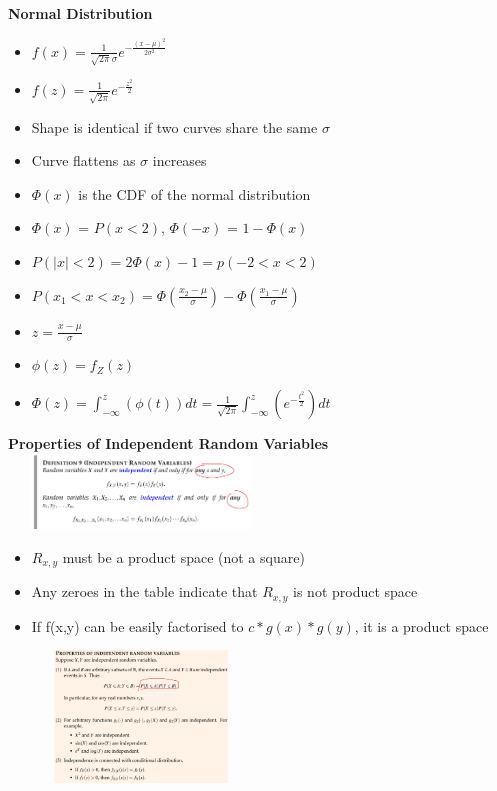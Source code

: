 \documentclass[10pt, landscape]{article}
\begin{document}
\begin{multicols}{4}
\textbf{Normal Distribution} \newline
\begin{itemize}
  \item $f(x)=\frac{1}{\sqrt{2\pi}\sigma}e^{-\frac{(x-\mu)^2}{2\sigma^2}}$
  \item $f(z) = \frac{1}{\sqrt{2\pi}}e^{-\frac{z^2}{2}}$
  \item Shape is identical if two curves share the same $\sigma$
  \item Curve flattens as $\sigma$ increases
  \item $\Phi(x)$ is the CDF of the normal distribution
  \item $\Phi(x)$ = $P(x<2)$, $\Phi(-x)$ = $1-\Phi(x)$
  \item $P(|x|<2) = 2\Phi(x)-1 = p(-2<x<2)$
  \item $P(x_1<x<x_2)=\Phi(\frac{x_2-\mu}{\sigma})-\Phi(\frac{x_1-\mu}{\sigma})$
  \item $z=\frac{x-\mu}{\sigma}$
  \item $\phi(z)=f_Z(z)$
  \item $\Phi(z)=\int_{-\infty}^{z}(\phi(t))dt=\frac{1}{\sqrt{2\pi}}\int_{-\infty}^{z}(e^{-\frac{t^2}{2}})dt$
\end{itemize}

\textbf{Properties of Independent Random Variables} \newline
\includegraphics[width=7cm, height=2cm]{indepdent_random_var.png}
\begin{itemize}
  \item $R_{x,y}$ must be a product space (not a square)
  \item Any zeroes in the table indicate that $R_{x,y}$ is not product space
  \item If f(x,y) can be easily factorised to $c*g(x)*g(y)$, it is a product space
\end{itemize}
\includegraphics[width=7cm, height=3.5cm]{properties_independent_random.png}



\end{multicols}
\end{document}
